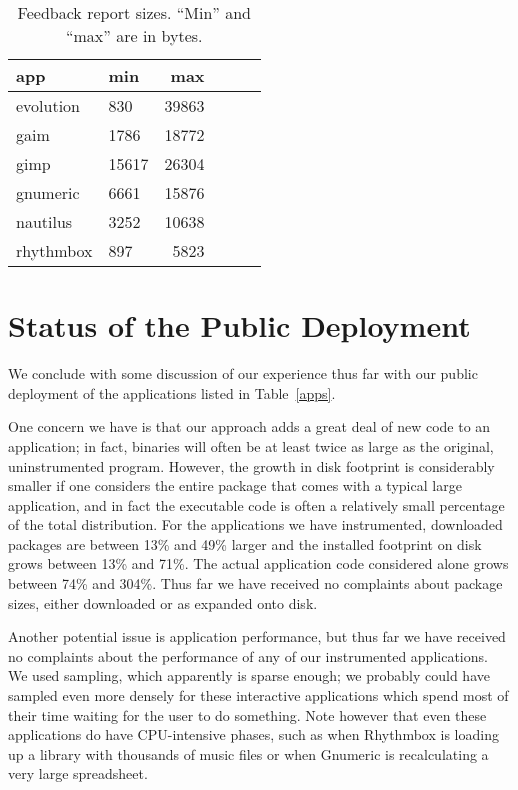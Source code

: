 \documentclass[times,10pt,twocolumn]{article}
\begin{document}
\begin{table}
  \centering
  \begin{tabular}{llrrrr}
    app & min & max  \\ \hline
    evolution & 830 & 39863  \\
    gaim & 1786 & 18772  \\
    gimp & 15617 & 26304  \\
    gnumeric & 6661 & 15876  \\
    nautilus & 3252 & 10638  \\
    rhythmbox & 897 & 5823 
  \end{tabular}
  \caption{Feedback report sizes.  ``Min'' and ``max''  are
    in bytes.}
  \label{report-sizes}
\end{table}

\section{Status of the Public Deployment}

We conclude with some discussion of our experience thus far with our public
deployment of the applications listed in Table~\ref{apps}.

One concern we have is that our approach adds a great deal of new code
to an application; in fact, binaries will often be at least twice as
large as the original, uninstrumented program.  However, the growth in
disk footprint is considerably smaller if one considers the entire
package that comes with a typical large application, and in fact the
executable code is often a relatively small percentage of the total
distribution.  For the applications we have instrumented, downloaded
packages are between 13\% and 49\% larger and the installed footprint on
disk grows between 13\% and 71\%.  The actual application code
considered alone grows between 74\% and 304\%.  Thus far we have
received no complaints about package sizes, either downloaded or as
expanded onto disk.

Another potential issue is application performance, but thus far we
have received no complaints about the performance of any of our
instrumented applications.  We used  sampling, which
apparently is sparse enough; we probably could have sampled even more
densely for these interactive applications which spend most of their
time waiting for the user to do something.  Note however that even
these applications do have CPU-intensive phases, such as when
Rhythmbox is loading up a library with thousands of music files or
when Gnumeric is recalculating a very large spreadsheet.
\end{document}
